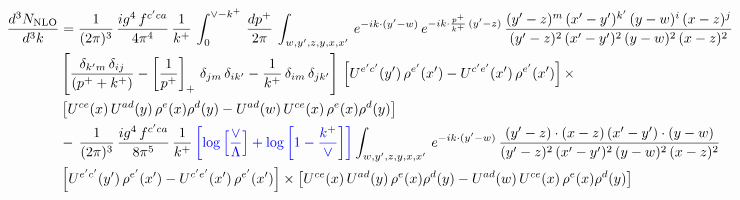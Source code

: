 \documentclass[9pt]{article}
\numberwithin{equation}{section}
\begin{document}
\begin{align}
    \frac{d^{3}N_{\rm NLO}}{d^{3}k} & = \frac{1}{(2\pi)^{3}}\, \frac{ig^{4}\,f^{c'ca}}{4\pi^{4}}\, \frac{1}{k^{+}}\,\int_{0}^{\vee-k^{+}}\, \frac{dp^{+}}{2\pi}\, \int_{w,y',z,y,x,x'}\, e^{-ik\cdot (y'-w)}\, e^{-ik\cdot \frac{p^{+}}{k^{+}}\,(y'-z)}\,\frac{(y'-z)^{m}\,(x'-y')^{k'}\,(y-w)^{i}\,(x-z)^{j}}{(y'-z)^{2}\,(x'-y')^{2}\,(y-w)^{2}\,(x-z)^{2}}\notag \\ & \left[\frac{\delta_{k'm}\,\delta_{ij}}{(p^{+}+k^{+})}-\left[\frac{1}{p^{+}}\right]_{+}\,\delta_{jm}\,\delta_{ik'}-\frac{1}{k^{+}}\, \delta_{im}\, \delta_{jk'}\right]\, \left[U^{e'c'}(y')\,\rho^{e'}(x')-U^{c'e'}(x')\,\rho^{e'}(x')\right]\times \notag \\ &  \left[U^{ce}(x)\,U^{ad}(y)\,\rho^{e}(x)\rho^{d}(y)-U^{ad}(w)\,U^{ce}(x)\,\rho^{e}(x)\rho^{d}(y)\right]\notag \\ & -\,\frac{1}{(2\pi)^{3}}\, \frac{ig^{4}\,f^{c'ca}}{8\pi^{5}}\, \frac{1}{k^{+}}\,{\color{blue}\left[\log{\left[\frac{\vee}{\Lambda}\right]} + \log{\left[1-\frac{k^{+}}{\vee}\right]}\right]} \int_{w,y',z,y,x,x'}\, e^{-ik\cdot (y'-w)}\,\frac{(y'-z)\cdot (x-z)\,(x'-y')\cdot (y-w)}{(y'-z)^{2}\,(x'-y')^{2}\,(y-w)^{2}\,(x-z)^{2}}\notag \\ & \left[U^{e'c'}(y')\,\rho^{e'}(x')-U^{c'e'}(x')\,\rho^{e'}(x')\right]\times  \left[U^{ce}(x)\,U^{ad}(y)\,\rho^{e}(x)\rho^{d}(y)-U^{ad}(w)\,U^{ce}(x)\,\rho^{e}(x)\rho^{d}(y)\right]
\end{align}
\end{document}
